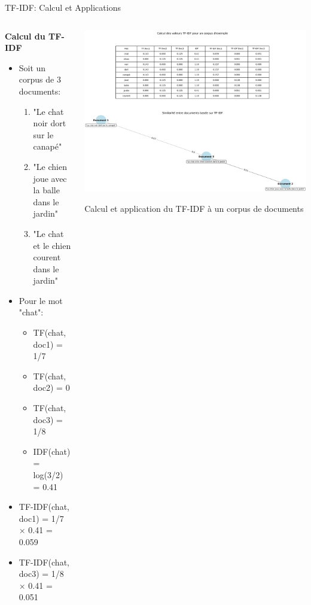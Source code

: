 \documentclass[aspectratio=169,11pt]{beamer}
\begin{document}
\begin{frame}{TF-IDF: Calcul et Applications}
    \begin{columns}
        \begin{column}{0.45\textwidth}
            \textbf{Calcul du TF-IDF}
            \begin{itemize}
                \item Soit un corpus de 3 documents:
                \begin{enumerate}
                    \item "Le chat noir dort sur le canapé"
                    \item "Le chien joue avec la balle dans le jardin"
                    \item "Le chat et le chien courent dans le jardin"
                \end{enumerate}
                \item Pour le mot "chat":
                \begin{itemize}
                    \item TF(chat, doc1) = 1/7
                    \item TF(chat, doc2) = 0
                    \item TF(chat, doc3) = 1/8
                    \item IDF(chat) = log(3/2) = 0.41
                \end{itemize}
                \item TF-IDF(chat, doc1) = 1/7 × 0.41 = 0.059
                \item TF-IDF(chat, doc3) = 1/8 × 0.41 = 0.051
            \end{itemize}
        \end{column}
        \begin{column}{0.55\textwidth}
            \includegraphics[width=\textwidth]{images/generated/tfidf.png}
            \vspace{-0.3cm}
            \begin{center}
                \small{Calcul et application du TF-IDF à un corpus de documents}
            \end{center}
        \end{column}
    \end{columns}
\end{frame}
\end{document}

